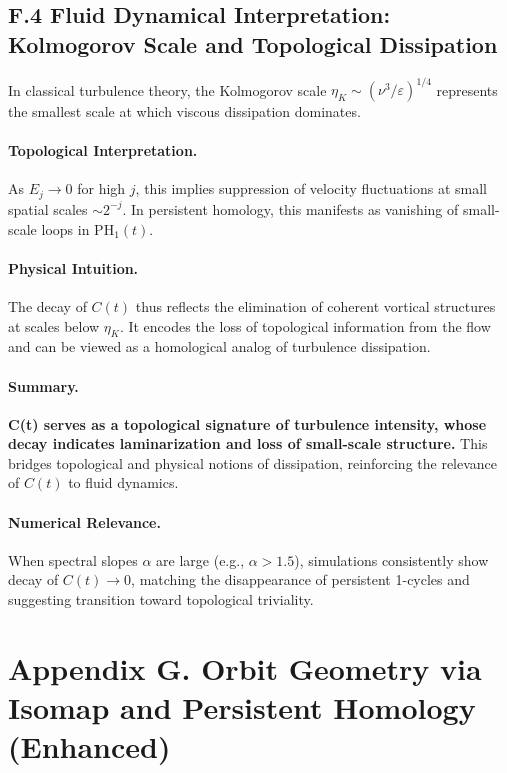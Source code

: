 \documentclass[11pt]{article}
\theoremstyle{definition}
\begin{document}
\subsection*{F.4 Fluid Dynamical Interpretation: Kolmogorov Scale and Topological Dissipation}

In classical turbulence theory, the Kolmogorov scale \( \eta_K \sim (\nu^3 / \varepsilon)^{1/4} \) represents the smallest scale at which viscous dissipation dominates.

\paragraph{Topological Interpretation.} As \( E_j \to 0 \) for high \( j \), this implies suppression of velocity fluctuations at small spatial scales \( \sim 2^{-j} \). In persistent homology, this manifests as vanishing of small-scale loops in \( \mathrm{PH}_1(t) \).

\paragraph{Physical Intuition.} The decay of \( C(t) \) thus reflects the elimination of coherent vortical structures at scales below \( \eta_K \). It encodes the loss of topological information from the flow and can be viewed as a homological analog of turbulence dissipation.

\paragraph{Summary.} \textbf{C(t) serves as a topological signature of turbulence intensity, whose decay indicates laminarization and loss of small-scale structure.} This bridges topological and physical notions of dissipation, reinforcing the relevance of \( C(t) \) to fluid dynamics.

\paragraph{Numerical Relevance.} When spectral slopes \( \alpha \) are large (e.g., \( \alpha > 1.5 \)), simulations consistently show decay of \( C(t) \to 0 \), matching the disappearance of persistent 1-cycles and suggesting transition toward topological triviality.


\section*{Appendix G. Orbit Geometry via Isomap and Persistent Homology (Enhanced)}
\end{document}
